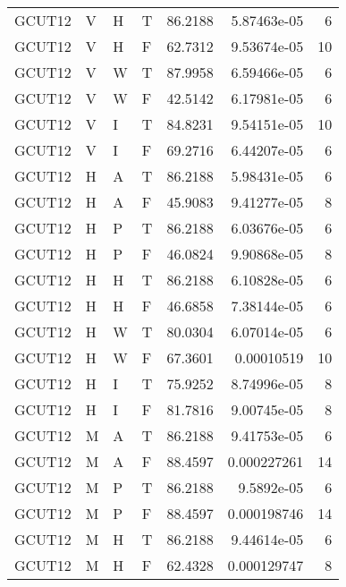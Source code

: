 \begin{longtable}{llllrrr}
    GCUT12   & V     & H     & T          & 86.2188    & 5.87463e-05 & 6        \\
    GCUT12   & V     & H     & F          & 62.7312    & 9.53674e-05 & 10       \\
    GCUT12   & V     & W     & T          & 87.9958    & 6.59466e-05 & 6        \\
    GCUT12   & V     & W     & F          & 42.5142    & 6.17981e-05 & 6        \\
    GCUT12   & V     & I     & T          & 84.8231    & 9.54151e-05 & 10       \\
    GCUT12   & V     & I     & F          & 69.2716    & 6.44207e-05 & 6        \\
    GCUT12   & H     & A     & T          & 86.2188    & 5.98431e-05 & 6        \\
    GCUT12   & H     & A     & F          & 45.9083    & 9.41277e-05 & 8        \\
    GCUT12   & H     & P     & T          & 86.2188    & 6.03676e-05 & 6        \\
    GCUT12   & H     & P     & F          & 46.0824    & 9.90868e-05 & 8        \\
    GCUT12   & H     & H     & T          & 86.2188    & 6.10828e-05 & 6        \\
    GCUT12   & H     & H     & F          & 46.6858    & 7.38144e-05 & 6        \\
    GCUT12   & H     & W     & T          & 80.0304    & 6.07014e-05 & 6        \\
    GCUT12   & H     & W     & F          & 67.3601    & 0.00010519  & 10       \\
    GCUT12   & H     & I     & T          & 75.9252    & 8.74996e-05 & 8        \\
    GCUT12   & H     & I     & F          & 81.7816    & 9.00745e-05 & 8        \\
    GCUT12   & M     & A     & T          & 86.2188    & 9.41753e-05 & 6        \\
    GCUT12   & M     & A     & F          & 88.4597    & 0.000227261 & 14       \\
    GCUT12   & M     & P     & T          & 86.2188    & 9.5892e-05  & 6        \\
    GCUT12   & M     & P     & F          & 88.4597    & 0.000198746 & 14       \\
    GCUT12   & M     & H     & T          & 86.2188    & 9.44614e-05 & 6        \\
    GCUT12   & M     & H     & F          & 62.4328    & 0.000129747 & 8        \\

\end{longtable}
